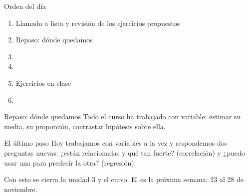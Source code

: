 \documentclass[aspectratio=169,10pt]{beamer}
\begin{document}
\portada

\begin{frame}{Orden del día}
  \begin{enumerate}
    \item Llamado a lista y revisión de los ejercicios propuestos
    \item Repaso: dónde quedamos
    \item {}
    \item {}
    \item Ejercicios en clase
    \item {}
  \end{enumerate}
\end{frame}

\begin{frame}{Repaso: dónde quedamos}
  Todo el curso ha trabajado con  variable: estimar su media, su
  proporción, contrastar hipótesis sobre ella.

  \vspace{0.25cm}
  \begin{alertblock}{El último paso}
    \footnotesize
    Hoy trabajamos con  variables a la vez y respondemos dos
    preguntas nuevas: ¿están relacionadas y qué tan fuerte? (correlación) y
    ¿puedo usar una para predecir la otra? (regresión).
  \end{alertblock}

  \vspace{0.15cm}
  {\footnotesize\color{uniGris} Con esto se cierra la unidad 3 y el curso. El
   es la próxima semana: 23 al 28 de noviembre.}
\end{frame}

\end{document}
